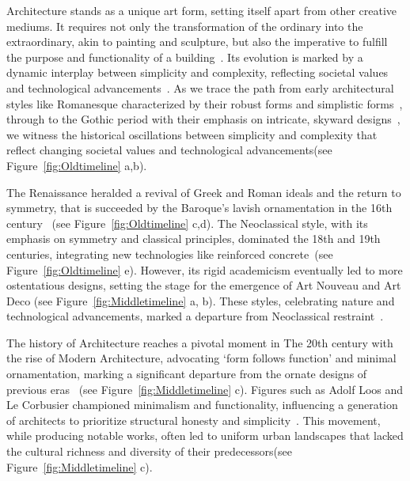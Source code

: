 


Architecture stands as a unique art form, setting itself apart from other creative mediums.
It requires not only the transformation of the ordinary into the extraordinary, akin to painting and sculpture, but also the imperative to fulfill the purpose and functionality of a building~\cite{Hnin2022}.
Its evolution is marked by a dynamic interplay between simplicity and complexity, reflecting societal values and technological advancements~\cite{Economakis2023}.
As we trace the path from early architectural styles like Romanesque characterized by their robust forms and simplistic forms~\cite{Arora2023}, through to the Gothic period with their emphasis on intricate, skyward designs~\cite{Stacbond2020}, we witness the historical oscillations between simplicity and complexity that reflect changing societal values and technological advancements(see Figure~\ref{fig:Oldtimeline} a,b).

The Renaissance heralded a revival of Greek and Roman ideals and the return to symmetry, that is succeeded by the Baroque's lavish ornamentation in the 16th century~\cite{Economakis2023} (see Figure~\ref{fig:Oldtimeline} c,d).
The Neoclassical style, with its emphasis on symmetry and classical principles, dominated the 18th and 19th centuries, integrating new technologies like reinforced concrete~\cite{Economakis2023}(see Figure~\ref{fig:Oldtimeline} e).
However, its rigid academicism eventually led to more ostentatious designs, setting the stage for the emergence of Art Nouveau and Art Deco (see Figure~\ref{fig:Middletimeline} a, b).
These styles, celebrating nature and technological advancements, marked a departure from Neoclassical restraint~\cite{Salas2018, Arora2023}.

The history of Architecture reaches a pivotal moment in The 20th century with the rise of Modern Architecture, advocating `form follows function' and minimal ornamentation, marking a significant departure from the ornate designs of previous eras~\cite{Gage2015} (see Figure~\ref{fig:Middletimeline} c).
Figures such as Adolf Loos and Le Corbusier championed minimalism and functionality, influencing a generation of architects to prioritize structural honesty and simplicity~\cite{Saglam2014}.
This movement, while producing notable works, often led to uniform urban landscapes that lacked the cultural richness and diversity of their predecessors(see Figure~\ref{fig:Middletimeline} c).

